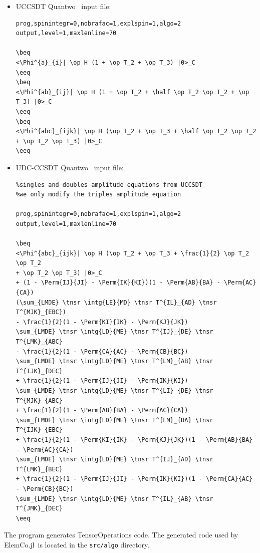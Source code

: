 \documentclass[a4paper,12pt,oneside]{book}
\newcommand{\veryshortarrow}[1][3pt]{\mathrel{%
   \hbox{\rule[\dimexpr\fontdimen22\textfont2-.2pt\relax]{#1}{.4pt}}%
   \mkern-4mu\hbox{\usefont{U}{lasy}{m}{n}\symbol{41}}}}
\newcommand{\beq}{\begin{equation}\begin{aligned}}
\newcommand{\eeq}{\end{aligned}\end{equation}}
\newcommand{\half}{\frac{1}{2}}
\newcommand{\op}{\hat}
\newcommand{\tnsr}{}
\newcommand{\Perm}[2]{{\cal P}\left({#1}\veryshortarrow {#2}\right)}
\newcommand{\elemcoil}{\textsf{ElemCo.jl}}
\newcommand{\quantwo}{\textsf{Quantwo} }
\begin{document}
\begin{itemize}
  \item UCCSDT \quantwo\ input file:
\begin{lstlisting}
prog,spinintegr=0,nobrafac=1,explspin=1,algo=2
output,level=1,maxlenline=70

\beq
<\Phi^{a}_{i}| \op H (1 + \op T_2 + \op T_3) |0>_C
\eeq
\beq
<\Phi^{ab}_{ij}| \op H (1 + \op T_2 + \half \op T_2 \op T_2 + \op T_3) |0>_C
\eeq
\beq
<\Phi^{abc}_{ijk}| \op H (\op T_2 + \op T_3 + \half \op T_2 \op T_2 + \op T_2 \op T_3) |0>_C
\eeq
\end{lstlisting}
\item UDC-CCSDT \quantwo\ input file:
\begin{lstlisting}
%singles and doubles amplitude equations from UCCSDT
%we only modify the triples amplitude equation

prog,spinintegr=0,nobrafac=1,explspin=1,algo=2
output,level=1,maxlenline=70

\beq
<\Phi^{abc}_{ijk}| \op H (\op T_2 + \op T_3 + \frac{1}{2} \op T_2 \op T_2 
+ \op T_2 \op T_3) |0>_C 
+ (1 - \Perm{IJ}{JI} - \Perm{IK}{KI})(1 - \Perm{AB}{BA} - \Perm{AC}{CA})
(\sum_{LMDE} \tnsr \intg{LE}{MD} \tnsr T^{IL}_{AD} \tnsr T^{MJK}_{EBC}) 
- \frac{1}{2}(1 - \Perm{KI}{IK} - \Perm{KJ}{JK}) 
\sum_{LMDE} \tnsr \intg{LD}{ME} \tnsr T^{IJ}_{DE} \tnsr T^{LMK}_{ABC} 
- \frac{1}{2}(1 - \Perm{CA}{AC} - \Perm{CB}{BC}) 
\sum_{LMDE} \tnsr \intg{LD}{ME} \tnsr T^{LM}_{AB} \tnsr T^{IJK}_{DEC} 
+ \frac{1}{2}(1 - \Perm{IJ}{JI} - \Perm{IK}{KI}) 
\sum_{LMDE} \tnsr \intg{LD}{ME} \tnsr T^{LI}_{DE} \tnsr T^{MJK}_{ABC} 
+ \frac{1}{2}(1 - \Perm{AB}{BA} - \Perm{AC}{CA}) 
\sum_{LMDE} \tnsr \intg{LD}{ME} \tnsr T^{LM}_{DA} \tnsr T^{IJK}_{EBC} 
+ \frac{1}{2}(1 - \Perm{KI}{IK} - \Perm{KJ}{JK})(1 - \Perm{AB}{BA} - \Perm{AC}{CA}) 
\sum_{LMDE} \tnsr \intg{LD}{ME} \tnsr T^{IJ}_{AD} \tnsr T^{LMK}_{BEC} 
+ \frac{1}{2}(1 - \Perm{IJ}{JI} - \Perm{IK}{KI})(1 - \Perm{CA}{AC} - \Perm{CB}{BC}) 
\sum_{LMDE} \tnsr \intg{LD}{ME} \tnsr T^{IL}_{AB} \tnsr T^{JMK}_{DEC}
\eeq
\end{lstlisting}
\end{itemize}
\noindent The program generates \textsf{TensorOperations} code.
The generated code  used by \elemcoil\ is located in the \texttt{src/algo} directory. 


\end{document}
